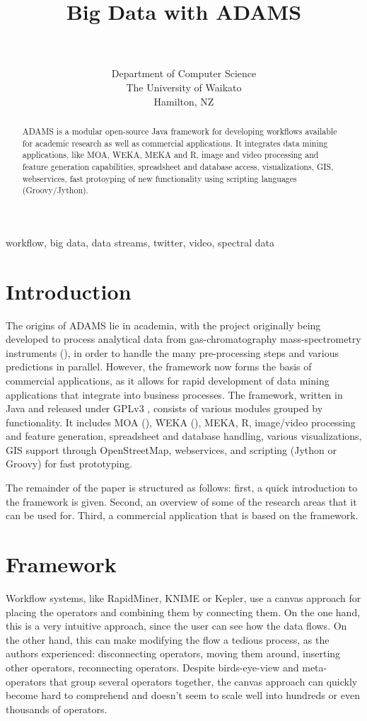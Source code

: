 \documentclass[wcp]{jmlr}
\title[Big Data with ADAMS]{Big Data with ADAMS}
\author{\Name{Peter Reutemann} \Email{fracpete@waikato.ac.nz} \\
  \Name{Geoff Holmes} \Email{geoff@waikato.ac.nz}\\
  \addr Department of Computer Science \\
  The University of Waikato \\
  Hamilton, NZ
 }
\begin{document}
\maketitle

\begin{abstract}
ADAMS is a modular open-source Java framework for developing workflows available for
academic research as well as commercial applications. It integrates
data mining applications, like MOA, WEKA, MEKA and R, image and video
processing and feature generation capabilities, spreadsheet and database
access, visualizations, GIS, webservices, fast protoyping of new 
functionality using scripting languages (Groovy/Jython).
\end{abstract}
\begin{keywords}
workflow, big data, data streams, twitter, video, spectral data
\end{keywords}

\section{Introduction}
The origins of ADAMS lie in academia, with the project originally being developed to process analytical data from gas-chromatography mass-spectrometry instruments (\cite{gcms}), in order to handle the many pre-processing steps and various predictions in parallel. However, the framework now forms the basis of commercial applications, as it allows for rapid development of data mining applications that integrate into business processes. The framework, written in Java and released under GPLv3
, consists of various modules grouped by functionality. It includes MOA (\cite{moa}), WEKA (\cite{weka}), MEKA, R, image/video processing and feature generation, spreadsheet and database handling, various visualizations, GIS support through OpenStreetMap, webservices, and scripting (Jython or Groovy) for fast prototyping.

The remainder of the paper is structured as follows: first, a quick introduction to the framework is given. Second, an overview of some of the research areas that it can be used for. Third, a commercial application that is based on the framework.

\section{Framework}
Workflow systems, like RapidMiner, KNIME or Kepler, use a canvas approach for placing the operators and combining them by connecting them. On the one hand, this is a very intuitive approach, since the user can see how the data flows. On the other hand, this can make modifying the flow a tedious process, as the authors experienced: disconnecting operators, moving them around, inserting other operators, reconnecting operators. Despite birds-eye-view and meta-operators that group several operators together, the canvas approach can quickly become hard to comprehend and doesn't seem to scale well into hundreds or even thousands of operators.
\end{document}
